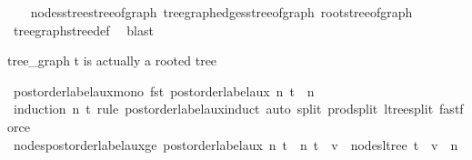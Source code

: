 \begin{isabellebody}
%
\isadelimproof
\ \ %
\endisadelimproof
%
\isatagproof
{}\isamarkupfalse%
\ nodes{\isacharunderscore}{\kern0pt}stree{\isacharunderscore}{\kern0pt}stree{\isacharunderscore}{\kern0pt}of{\isacharunderscore}{\kern0pt}graph\ tree{\isacharunderscore}{\kern0pt}graph{\isacharunderscore}{\kern0pt}edges{\isacharunderscore}{\kern0pt}stree{\isacharunderscore}{\kern0pt}of{\isacharunderscore}{\kern0pt}graph\ root{\isacharunderscore}{\kern0pt}stree{\isacharunderscore}{\kern0pt}of{\isacharunderscore}{\kern0pt}graph\ \isamarkupfalse%
\ tree{\isacharunderscore}{\kern0pt}graph{\isacharunderscore}{\kern0pt}stree{\isacharunderscore}{\kern0pt}def\ \isamarkupfalse%
\ blast%
\endisatagproof
{\isafoldproof}%
%
\isadelimproof
%
\endisadelimproof
%
\begin{isamarkuptext}%
tree_graph t is actually a rooted tree%
\end{isamarkuptext}\isamarkuptrue%
\isamarkupfalse%
\ postorder{\isacharunderscore}{\kern0pt}label{\isacharunderscore}{\kern0pt}aux{\isacharunderscore}{\kern0pt}mono{\isacharcolon}{\kern0pt}\ {\isachardoublequoteopen}fst\ {\isacharparenleft}{\kern0pt}postorder{\isacharunderscore}{\kern0pt}label{\isacharunderscore}{\kern0pt}aux\ n\ t{\isacharparenright}{\kern0pt}\ {\isasymge}\ n{\isachardoublequoteclose}\isanewline
%
\isadelimproof
\ \ %
\endisadelimproof
%
\isatagproof
{}\isamarkupfalse%
\ {\isacharparenleft}{\kern0pt}induction\ n\ t\ rule{\isacharcolon}{\kern0pt}\ postorder{\isacharunderscore}{\kern0pt}label{\isacharunderscore}{\kern0pt}aux{\isachardot}{\kern0pt}induct{\isacharparenright}{\kern0pt}\ {\isacharparenleft}{\kern0pt}auto\ split{\isacharcolon}{\kern0pt}\ prod{\isachardot}{\kern0pt}split\ ltree{\isachardot}{\kern0pt}split{\isacharcomma}{\kern0pt}\ fastforce{\isacharparenright}{\kern0pt}%
\endisatagproof
{\isafoldproof}%
%
\isadelimproof
\isanewline
%
\endisadelimproof
\isanewline
{}\isamarkupfalse%
\ nodes{\isacharunderscore}{\kern0pt}postorder{\isacharunderscore}{\kern0pt}label{\isacharunderscore}{\kern0pt}aux{\isacharunderscore}{\kern0pt}ge{\isacharcolon}{\kern0pt}\ {\isachardoublequoteopen}postorder{\isacharunderscore}{\kern0pt}label{\isacharunderscore}{\kern0pt}aux\ n\ t\ {\isacharequal}{\kern0pt}\ {\isacharparenleft}{\kern0pt}n{\isacharprime}{\kern0pt}{\isacharcomma}{\kern0pt}\ t{\isacharprime}{\kern0pt}{\isacharparenright}{\kern0pt}\ {\isasymLongrightarrow}\ v\ {\isasymin}\ nodes{\isacharunderscore}{\kern0pt}ltree\ t{\isacharprime}{\kern0pt}\ {\isasymLongrightarrow}\ v\ {\isasymge}\ n{\isachardoublequoteclose}\isanewline

\end{isabellebody}
